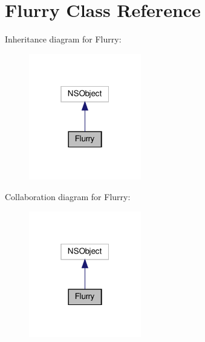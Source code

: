 \hypertarget{interfaceFlurry}{}\section{Flurry Class Reference}
\label{interfaceFlurry}


Inheritance diagram for Flurry\+:
\nopagebreak
\begin{figure}[H]
\begin{center}
\leavevmode
\includegraphics[width=139pt]{interfaceFlurry__inherit__graph}
\end{center}
\end{figure}


Collaboration diagram for Flurry\+:
\nopagebreak
\begin{figure}[H]
\begin{center}
\leavevmode
\includegraphics[width=139pt]{interfaceFlurry__coll__graph}
\end{center}
\end{figure}

